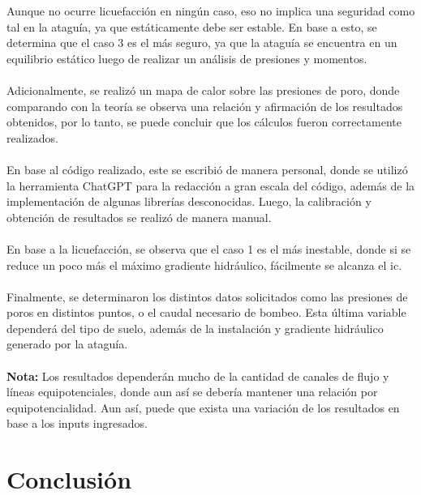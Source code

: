 Aunque no ocurre licuefacción en ningún caso, eso no implica una seguridad como tal en la ataguía, ya que estáticamente debe ser estable. En base a esto, se determina que el caso 3 es el más seguro, ya que la ataguía se encuentra en un equilibrio estático luego de realizar un análisis de presiones y momentos.
\\ \\
Adicionalmente, se realizó un mapa de calor sobre las presiones de poro, donde comparando con la teoría se observa una relación y afirmación de los resultados obtenidos, por lo tanto, se puede concluir que los cálculos fueron correctamente realizados.
\\ \\
En base al código realizado, este se escribió de manera personal, donde se utilizó la herramienta ChatGPT para la redacción a gran escala del código, además de la implementación de algunas librerías desconocidas. Luego, la calibración y obtención de resultados se realizó de manera manual.
\\ \\
En base a la licuefacción, se observa que el caso 1 es el más inestable, donde si se reduce un poco más el máximo gradiente hidráulico, fácilmente se alcanza el ic.
\\ \\
Finalmente, se determinaron los distintos datos solicitados como las presiones de poros en distintos puntos, o el caudal necesario de bombeo. Esta última variable dependerá del tipo de suelo, además de la instalación y gradiente hidráulico generado por la ataguía.
\\ \\
\textbf{Nota:} Los resultados dependerán mucho de la cantidad de canales de flujo y líneas equipotenciales, donde aun así se debería mantener una relación por equipotencialidad. Aun así, puede que exista una variación de los resultados en base a los inputs ingresados.

\section{Conclusión}

